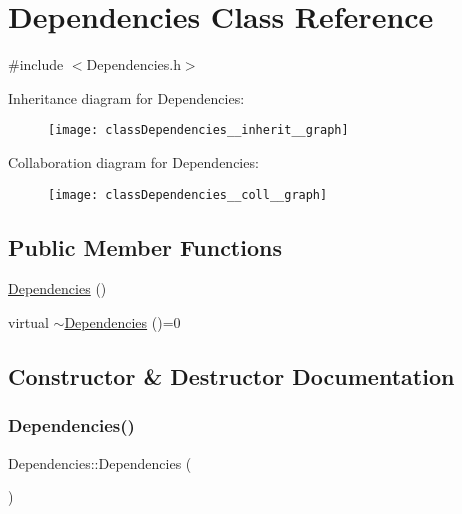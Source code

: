 \hypertarget{classDependencies}{}\section{Dependencies Class Reference}
\label{classDependencies}


{\ttfamily \#include $<$Dependencies.\+h$>$}



Inheritance diagram for Dependencies\+:\nopagebreak
\begin{figure}[H]
\begin{center}
\leavevmode
\texttt{[image: classDependencies\_\_inherit\_\_graph]}
\end{center}
\end{figure}


Collaboration diagram for Dependencies\+:\nopagebreak
\begin{figure}[H]
\begin{center}
\leavevmode
\texttt{[image: classDependencies\_\_coll\_\_graph]}
\end{center}
\end{figure}
\subsection*{Public Member Functions}
\begin{DoxyCompactItemize}
\item 
\hyperlink{classDependencies_afb4e8de48db17417cb0b3e5b57a17af4}{Dependencies} ()
\item 
virtual \hyperlink{classDependencies_aeaa0706664765dd19c545f9683bf1aea}{$\sim$\+Dependencies} ()=0
\end{DoxyCompactItemize}


\subsection{Constructor \& Destructor Documentation}
\mbox{\label{classDependencies_afb4e8de48db17417cb0b3e5b57a17af4}} 
\subsubsection{\texorpdfstring{Dependencies()}{Dependencies()}}
{\footnotesize\ttfamily Dependencies\+::\+Dependencies (\begin{DoxyParamCaption}{ }\end{DoxyParamCaption})}

